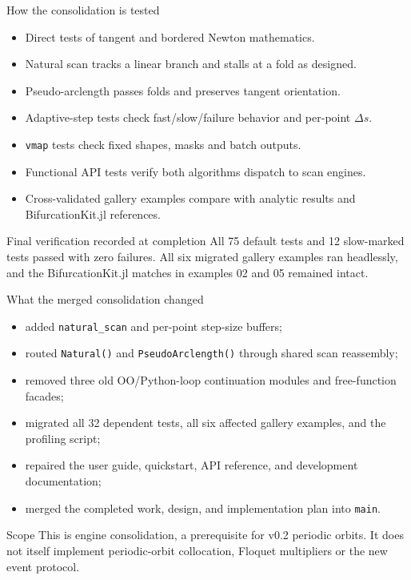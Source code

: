 \documentclass[aspectratio=169,10pt]{beamer}
\begin{document}
\begin{frame}{How the consolidation is tested}
\begin{itemize}
  \item Direct tests of tangent and bordered Newton mathematics.
  \item Natural scan tracks a linear branch and stalls at a fold as designed.
  \item Pseudo-arclength passes folds and preserves tangent orientation.
  \item Adaptive-step tests check fast/slow/failure behavior and per-point $\Delta s$.
  \item \texttt{vmap} tests check fixed shapes, masks and batch outputs.
  \item Functional API tests verify both algorithms dispatch to scan engines.
  \item Cross-validated gallery examples compare with analytic results and BifurcationKit.jl references.
\end{itemize}
\begin{block}{Final verification recorded at completion}
All 75 default tests and 12 slow-marked tests passed with zero failures. All six
migrated gallery examples ran headlessly, and the BifurcationKit.jl matches in
examples 02 and 05 remained intact.
\end{block}
\end{frame}

\begin{frame}{What the merged consolidation changed}
\begin{itemize}
  \item added \texttt{natural\_scan} and per-point step-size buffers;
  \item routed \texttt{Natural()} and \texttt{PseudoArclength()} through shared scan reassembly;
  \item removed three old OO/Python-loop continuation modules and free-function facades;
  \item migrated all 32 dependent tests, all six affected gallery examples, and the profiling script;
  \item repaired the user guide, quickstart, API reference, and development documentation;
  \item merged the completed work, design, and implementation plan into \texttt{main}.
\end{itemize}
\begin{alertblock}{Scope}
This is engine consolidation, a prerequisite for v0.2 periodic orbits. It does not itself implement periodic-orbit collocation, Floquet multipliers or the new event protocol.
\end{alertblock}
\end{frame}
\end{document}
